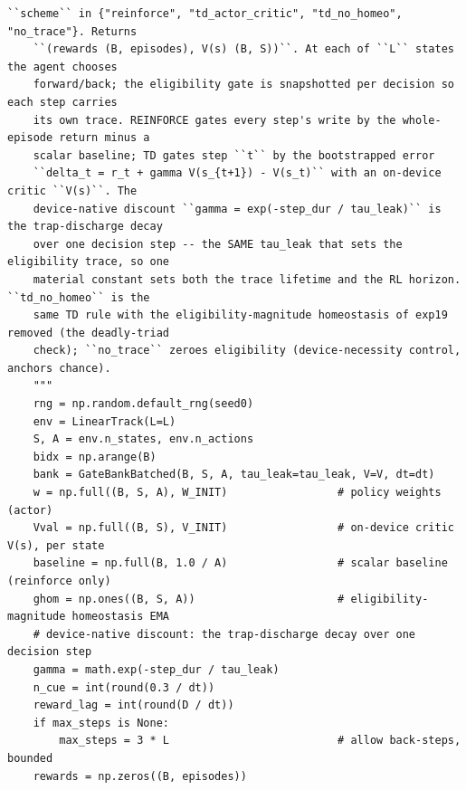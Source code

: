 \begin{lstlisting}[caption={mrl\_trace/extensions.py},label={lst:siox-src-extensions}]
    ``scheme`` in {"reinforce", "td_actor_critic", "td_no_homeo", "no_trace"}. Returns
    ``(rewards (B, episodes), V(s) (B, S))``. At each of ``L`` states the agent chooses
    forward/back; the eligibility gate is snapshotted per decision so each step carries
    its own trace. REINFORCE gates every step's write by the whole-episode return minus a
    scalar baseline; TD gates step ``t`` by the bootstrapped error
    ``delta_t = r_t + gamma V(s_{t+1}) - V(s_t)`` with an on-device critic ``V(s)``. The
    device-native discount ``gamma = exp(-step_dur / tau_leak)`` is the trap-discharge decay
    over one decision step -- the SAME tau_leak that sets the eligibility trace, so one
    material constant sets both the trace lifetime and the RL horizon. ``td_no_homeo`` is the
    same TD rule with the eligibility-magnitude homeostasis of exp19 removed (the deadly-triad
    check); ``no_trace`` zeroes eligibility (device-necessity control, anchors chance).
    """
    rng = np.random.default_rng(seed0)
    env = LinearTrack(L=L)
    S, A = env.n_states, env.n_actions
    bidx = np.arange(B)
    bank = GateBankBatched(B, S, A, tau_leak=tau_leak, V=V, dt=dt)
    w = np.full((B, S, A), W_INIT)                 # policy weights (actor)
    Vval = np.full((B, S), V_INIT)                 # on-device critic V(s), per state
    baseline = np.full(B, 1.0 / A)                 # scalar baseline (reinforce only)
    ghom = np.ones((B, S, A))                      # eligibility-magnitude homeostasis EMA
    # device-native discount: the trap-discharge decay over one decision step
    gamma = math.exp(-step_dur / tau_leak)
    n_cue = int(round(0.3 / dt))
    reward_lag = int(round(D / dt))
    if max_steps is None:
        max_steps = 3 * L                          # allow back-steps, bounded
    rewards = np.zeros((B, episodes))


\end{lstlisting}
